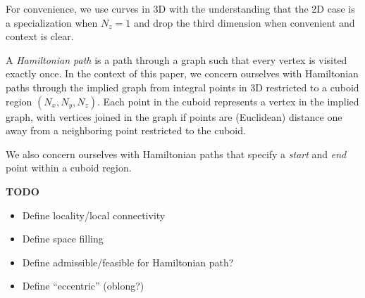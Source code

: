 For convenience, we use curves in 3D with the understanding that the 2D case is a specialization
when $N_z = 1$ and drop the third dimension when convenient and context is clear.

A \textit{Hamiltonian path} is a path through a graph such that every vertex is visited exactly once.
In the context of this paper, we concern ourselves with Hamiltonian paths through the implied
graph from integral points in 3D restricted to a cuboid region $(N_x, N_y, N_z)$.
Each point in the cuboid represents a vertex in the implied graph, with vertices joined in the graph
if points are (Euclidean) distance one away from a neighboring point restricted to the cuboid.

We also concern ourselves with Hamiltonian paths that specify a \textit{start} and \textit{end} point within
a cuboid region.


\textbf{TODO}

\begin{itemize}
  \item Define locality/local connectivity
  \item Define space filling
  \item Define admissible/feasible for Hamiltonian path?
  \item Define ``eccentric'' (oblong?)
\end{itemize}


